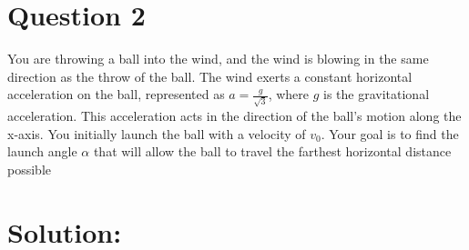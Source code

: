 \section*{Question 2}
You are throwing a ball into the wind, and the wind is blowing in the same direction as the throw of the ball. The wind exerts a constant horizontal acceleration on the ball, represented as $a=\frac{g}{\sqrt{3}}$, where $g$ is the gravitational acceleration. This acceleration acts in the direction of the ball's motion along the x-axis. You initially launch the ball with a velocity of $v_0$. Your goal is to find the launch angle $\alpha$ that will allow the ball to travel the farthest horizontal distance possible

\section*{Solution:}